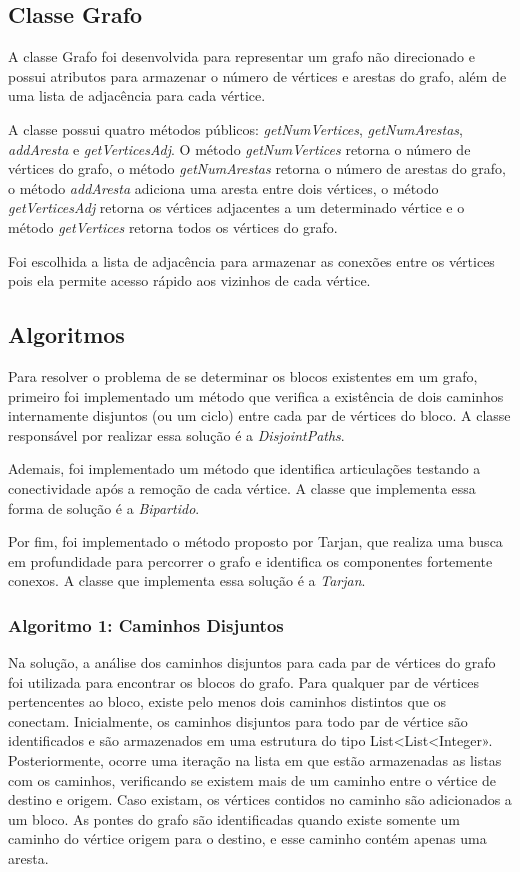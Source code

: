 


\subsection{\esp Classe Grafo}
A classe Grafo foi desenvolvida para representar um grafo não direcionado e possui atributos para armazenar o número de vértices e arestas do grafo, além de uma lista de adjacência para cada vértice.

A classe possui quatro métodos públicos:  \textit{getNumVertices}, \textit{getNumArestas}, \textit{addAresta} e \textit{getVerticesAdj}. O método \textit{getNumVertices} retorna o número de vértices do grafo, o método \textit{getNumArestas} retorna o número de arestas do grafo, o método \textit{addAresta} adiciona uma aresta entre dois vértices, o método \textit{getVerticesAdj} retorna os vértices adjacentes a um determinado vértice e o método \textit{getVertices} retorna todos os vértices do grafo.

Foi escolhida a lista de adjacência para armazenar as conexões entre os vértices pois ela permite acesso rápido aos vizinhos de cada vértice. 


\subsection{\esp Algoritmos}
Para resolver o problema de se determinar os blocos existentes em um grafo, primeiro foi implementado um método que verifica a existência de dois caminhos internamente disjuntos (ou um ciclo) entre cada par de vértices do bloco. A classe responsável por realizar essa solução é a \textit{DisjointPaths}. 

Ademais,  foi implementado um método que identifica articulações testando a conectividade após a remoção de cada vértice. A classe que implementa essa forma de solução é a \textit{Bipartido}. 

Por fim, foi implementado o método proposto por Tarjan, que realiza uma busca em profundidade para percorrer o grafo e identifica os componentes fortemente conexos. A classe que implementa essa solução é a \textit{Tarjan}. 


\subsubsection{\esp Algoritmo 1: Caminhos Disjuntos
}
 Na solução, a análise dos caminhos disjuntos para cada par de vértices do grafo foi
utilizada para encontrar os blocos do grafo. Para qualquer par de vértices pertencentes ao bloco,
existe pelo menos dois caminhos distintos que os conectam.
Inicialmente, os caminhos disjuntos para todo par de vértice são identificados e são
armazenados em uma estrutura do tipo List<List<Integer». Posteriormente, ocorre uma iteração
na lista em que estão armazenadas as listas com os caminhos, verificando se existem mais de
um caminho entre o vértice de destino e origem. Caso existam, os vértices contidos no caminho
são adicionados a um bloco.
As pontes do grafo são identificadas quando existe somente um caminho do vértice
origem para o destino, e esse caminho contém apenas uma aresta. 

